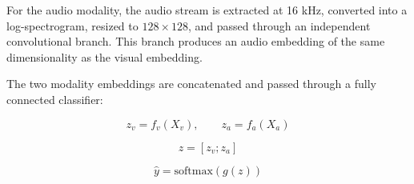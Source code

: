 \documentclass{article}
\begin{document}
For the audio modality, the audio stream is extracted at 16 kHz, converted into a log-spectrogram, resized to $128 \times 128$, and passed through an independent convolutional branch. This branch produces an audio embedding of the same dimensionality as the visual embedding.

The two modality embeddings are concatenated and passed through a fully connected classifier:

\begin{equation}
	z_v = f_v(X_v), \qquad z_a = f_a(X_a)
\end{equation}

\begin{equation}
	z = [z_v ; z_a]
\end{equation}

\begin{equation}
	\hat{y} = \mathrm{softmax}(g(z))
\end{equation}
\end{document}
